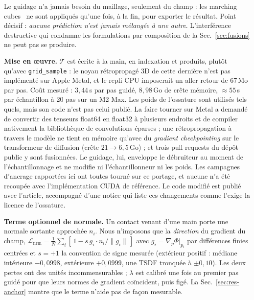 \documentclass[conference]{IEEEtran}
\begin{document}
Le guidage n'a jamais besoin du maillage, seulement du champ : les marching
cubes~\cite{marchingcubes} ne sont appliqués qu'une fois, à la fin, pour exporter le
résultat. Point décisif : \emph{aucune prédiction n'est jamais mélangée à une autre}.
L'interférence destructive qui condamne les formulations par composition de la
Sec.~\ref{sec:fusions} ne peut pas se produire.

\textbf{Mise en \oe{}uvre.} $\mathcal{T}$ est écrite à la main, en indexation et
produits, plutôt qu'avec \texttt{grid\_sample} : le noyau rétropropagé 3D de cette
dernière n'est pas implémenté sur Apple Metal, et le repli CPU imposerait un
aller-retour de 67\,Mo par pas. Coût mesuré : $3{,}44$\,s par pas guidé, $8{,}98$\,Go
de crête mémoire, $\approx 55$\,s par échantillon à 20 pas sur un M2 Max. Les poids de
l'ossature sont utilisés tels quels, mais son code n'est pas celui publié. La faire
tourner sur Metal a demandé de convertir des tenseurs float64 en float32 à plusieurs
endroits et de compiler nativement la bibliothèque de convolutions éparses ; une
rétropropagation à travers le modèle ne tient en mémoire qu'avec du \emph{gradient
checkpointing} sur le transformeur de diffusion (crête $21 \rightarrow 6{,}5$\,Go) ; et
trois pull requests du dépôt public y sont fusionnées. Le guidage, lui, enveloppe le
débruiteur au moment de l'échantillonnage et ne modifie ni l'échantillonneur ni les
poids. Les campagnes d'ancrage rapportées ici ont toutes tourné sur ce portage, et
aucune n'a été recoupée avec l'implémentation CUDA de référence. Le code modifié est
publié avec l'article, accompagné d'une notice qui liste ces changements comme l'exige
la licence de l'ossature.

\textbf{Terme optionnel de normale.} Un contact venant d'une main porte une normale
sortante approchée $n_i$. Nous n'imposons que la \emph{direction} du gradient du champ,
$\mathcal{L}_{\text{nrm}} = \frac{1}{N}\sum_i [\,1 - s\, g_i\!\cdot n_i / \lVert g_i
\rVert\,]$ avec $g_i = \nabla_{\!p}\Phi|_{p_i}$ par différences finies centrées et
$s = +1$ la convention de signe mesurée (extérieur positif : médiane intérieure
$-0{,}0998$, extérieure $+0{,}0999$, une TSDF tronquée à $\pm 0{,}10$). Les deux
pertes ont des unités incommensurables ; $\lambda$ est calibré une fois au premier pas
guidé pour que leurs normes de gradient coïncident, puis figé. La
Sec.~\ref{sec:res-anchor} montre que le terme n'aide pas de façon mesurable.
\end{document}
